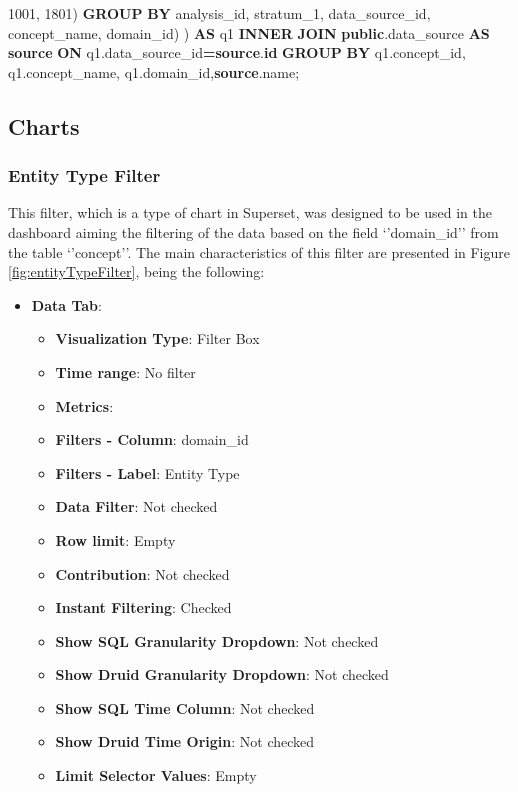\documentclass[
]{book}
\newenvironment{Shaded}{\begin{snugshade}}{\end{snugshade}}
\newcommand{\DecValTok}[1]{\textcolor[rgb]{0.00,0.00,0.81}{#1}}
\newcommand{\KeywordTok}[1]{\textcolor[rgb]{0.13,0.29,0.53}{\textbf{#1}}}
\newcommand{\NormalTok}[1]{#1}
\newcommand{\OperatorTok}[1]{\textcolor[rgb]{0.81,0.36,0.00}{\textbf{#1}}}
\providecommand{\tightlist}{%
  \setlength{\itemsep}{0pt}\setlength{\parskip}{0pt}}
\begin{document}
\begin{Shaded}
\begin{Highlighting}[]
                \DecValTok{1001}\NormalTok{, }\DecValTok{1801}\NormalTok{)}
            \KeywordTok{GROUP} \KeywordTok{BY}\NormalTok{ analysis\_id, stratum\_1, data\_source\_id, }
\NormalTok{                concept\_name, domain\_id) ) }\KeywordTok{AS}\NormalTok{ q1}
    \KeywordTok{INNER} \KeywordTok{JOIN} \KeywordTok{public}\NormalTok{.data\_source }\KeywordTok{AS} \KeywordTok{source} \KeywordTok{ON} 
\NormalTok{        q1.data\_source\_id}\OperatorTok{=}\KeywordTok{source}\NormalTok{.}\KeywordTok{id}
\KeywordTok{GROUP} \KeywordTok{BY}\NormalTok{ q1.concept\_id, q1.concept\_name, q1.domain\_id,}\KeywordTok{source}\NormalTok{.name;}
\end{Highlighting}
\end{Shaded}

\hypertarget{charts}{%
\subsection{Charts}\label{charts}}

\hypertarget{entity-type-filter}{%
\subsubsection{Entity Type Filter}\label{entity-type-filter}}

This filter, which is a type of chart in Superset, was designed to be used in the dashboard aiming the filtering of the data based on the field `'domain\_id'' from the table `'concept''. The main characteristics of this filter are presented in Figure \ref{fig:entityTypeFilter}, being the following:

\begin{itemize}
\tightlist
\item
  \textbf{Data Tab}:

  \begin{itemize}
  \tightlist
  \item
    \textbf{Visualization Type}: Filter Box
  \item
    \textbf{Time range}: No filter
  \item
    \textbf{Metrics}:
  \item
    \textbf{Filters - Column}: domain\_id
  \item
    \textbf{Filters - Label}: Entity Type
  \item
    \textbf{Data Filter}: Not checked
  \item
    \textbf{Row limit}: Empty
  \item
    \textbf{Contribution}: Not checked
  \item
    \textbf{Instant Filtering}: Checked
  \item
    \textbf{Show SQL Granularity Dropdown}: Not checked
  \item
    \textbf{Show Druid Granularity Dropdown}: Not checked
  \item
    \textbf{Show SQL Time Column}: Not checked
  \item
    \textbf{Show Druid Time Origin}: Not checked
  \item
    \textbf{Limit Selector Values}: Empty
  \end{itemize}
\end{itemize}
\end{document}
